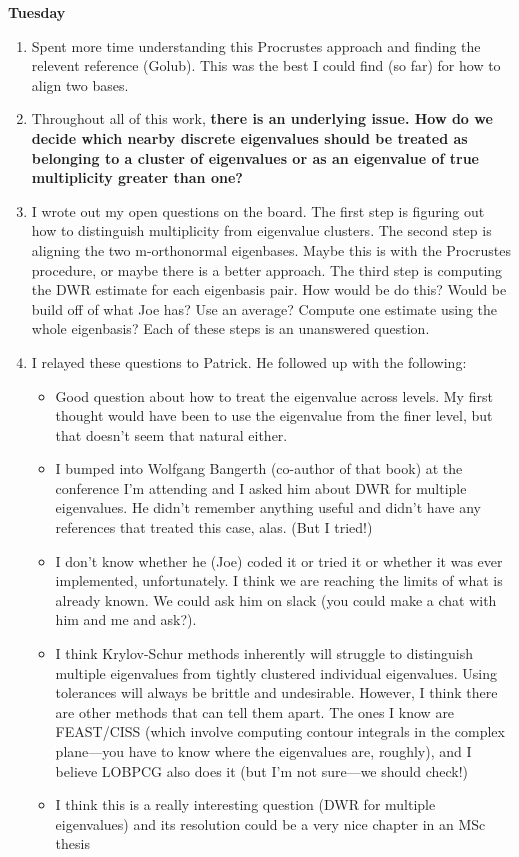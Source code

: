 \documentclass[12pt,a4paper]{article}
\begin{document}
\textbf{Tuesday}

\begin{enumerate}
    \item Spent more time understanding this Procrustes approach and finding the relevent reference (Golub). This was the best I could find (so far) for how to align two bases. 
    \item Throughout all of this work,\textbf{ there is an underlying issue. How do we decide which nearby discrete eigenvalues should be treated as belonging to a cluster of eigenvalues or as an eigenvalue of true multiplicity greater than one?} 
    \item I wrote out my open questions on the board. The first step is figuring out how to distinguish multiplicity from eigenvalue clusters. The second step is aligning the two m-orthonormal eigenbases. Maybe this is with the Procrustes procedure, or maybe there is a better approach. The third step is computing the DWR estimate for each eigenbasis pair. How would be do this? Would be build off of what Joe has? Use an average? Compute one estimate using the whole eigenbasis? Each of these steps is an unanswered question. 
    \item I relayed these questions to Patrick. He followed up with the following:
    \begin{itemize}

        \item Good question about how to treat the eigenvalue across levels. My first thought would have been to use the eigenvalue from the finer level, but that doesn't seem that natural either.

        \item I bumped into Wolfgang Bangerth (co-author of that book) at the conference I'm attending and I asked him about DWR for multiple eigenvalues. He didn't remember anything useful and didn't have any references that treated this case, alas. (But I tried!)
        
        \item I don't know whether he (Joe) coded it or tried it or whether it was ever implemented, unfortunately. I think we are reaching the limits of what is already known. We could ask him on slack (you could make a chat with him and me and ask?).
        \item I think Krylov-Schur methods inherently will struggle to distinguish multiple eigenvalues from tightly clustered individual eigenvalues. Using tolerances will always be brittle and undesirable. However, I think there are other methods that can tell them apart. The ones I know are FEAST/CISS (which involve computing contour integrals in the complex plane---you have to know where the eigenvalues are, roughly), and I believe LOBPCG also does it (but I'm not sure---we should check!)
        \item I think this is a really interesting question (DWR for multiple eigenvalues) and its resolution could be a very nice chapter in an MSc thesis
    \end{itemize}



\end{enumerate}
\end{document}
